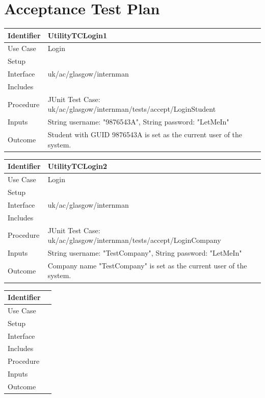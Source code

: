 \documentclass[11pt]{article}
\begin{document}
\newpage

\section{Acceptance Test Plan}

\begin{tabularx}{\textwidth}{|T|L|}
\hline
Identifier & UtilityTCLogin1\\
\hline
Use Case & Login\\
\hline
Setup &\\
\hline
Interface & uk/ac/glasgow/internman\\
\hline
Includes &\\
\hline
Procedure & JUnit Test Case: uk/ac/glasgow/internman/tests/accept/LoginStudent\\
\hline
Inputs & String username: "9876543A", String password: "LetMeIn"\\
\hline
Outcome & Student with GUID 9876543A is set as the current user of the system.\\
\hline
\end{tabularx}

\begin{tabularx}{\textwidth}{|T|L|}
\hline
Identifier & UtilityTCLogin2\\
\hline
Use Case & Login\\
\hline
Setup &\\
\hline
Interface & uk/ac/glasgow/internman\\
\hline
Includes &\\
\hline
Procedure & JUnit Test Case: uk/ac/glasgow/internman/tests/accept/LoginCompany\\
\hline
Inputs & String username: "TestCompany", String password: "LetMeIn"\\
\hline
Outcome & Company name "TestCompany" is set as the current user of the system.\\
\hline
\end{tabularx}

\begin{tabularx}{\textwidth}{|T|L|}
\hline
Identifier &\\
\hline
Use Case &\\
\hline
Setup &\\
\hline
Interface &\\
\hline
Includes &\\
\hline
Procedure &\\
\hline
Inputs &\\
\hline
Outcome &\\
\hline
\end{tabularx}
\end{document}
